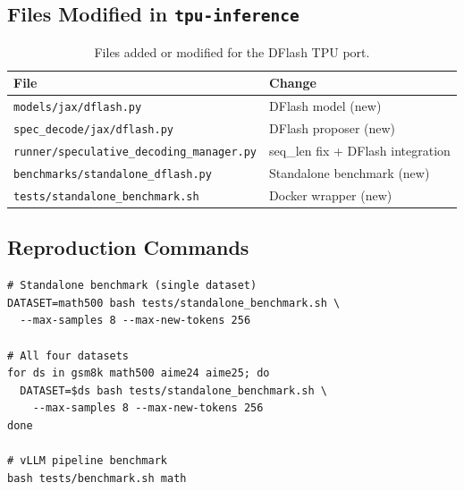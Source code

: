 \documentclass[12pt,letterpaper]{article}
\begin{document}

\makereference





\clearpage
\makeappendix

\subsection{Files Modified in \texttt{tpu-inference}}

\begin{table}[htbp]
\caption{Files added or modified for the DFlash TPU port.}
\centering
\begin{tabular}{l|l}
\toprule
File & Change \\
\midrule
\texttt{models/jax/dflash.py} & DFlash model (new) \\
\texttt{spec\_decode/jax/dflash.py} & DFlash proposer (new) \\
\texttt{runner/speculative\_decoding\_manager.py} & seq\_len fix + DFlash integration \\
\texttt{benchmarks/standalone\_dflash.py} & Standalone benchmark (new) \\
\texttt{tests/standalone\_benchmark.sh} & Docker wrapper (new) \\
\bottomrule
\end{tabular}
\end{table}

\subsection{Reproduction Commands}

\begin{verbatim}
# Standalone benchmark (single dataset)
DATASET=math500 bash tests/standalone_benchmark.sh \
  --max-samples 8 --max-new-tokens 256

# All four datasets
for ds in gsm8k math500 aime24 aime25; do
  DATASET=$ds bash tests/standalone_benchmark.sh \
    --max-samples 8 --max-new-tokens 256
done

# vLLM pipeline benchmark
bash tests/benchmark.sh math
\end{verbatim}
\end{document}
